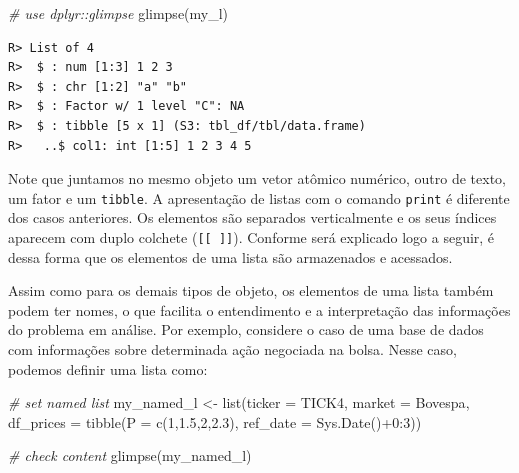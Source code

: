 \documentclass[
  11pt,
]{book}
\newenvironment{Shaded}{\begin{snugshade}}{\end{snugshade}}
\newcommand{\AttributeTok}[1]{\textcolor[rgb]{0.61,0.61,0.61}{#1}}
\newcommand{\CommentTok}[1]{\textcolor[rgb]{0.37,0.37,0.37}{\textit{#1}}}
\newcommand{\DecValTok}[1]{\textcolor[rgb]{0.06,0.06,0.06}{#1}}
\newcommand{\FloatTok}[1]{\textcolor[rgb]{0.06,0.06,0.06}{#1}}
\newcommand{\FunctionTok}[1]{\textcolor[rgb]{0,0,0}{#1}}
\newcommand{\NormalTok}[1]{#1}
\newcommand{\OtherTok}[1]{\textcolor[rgb]{0.37,0.37,0.37}{#1}}
\newcommand{\SpecialCharTok}[1]{\textcolor[rgb]{0,0,0}{#1}}
\newcommand{\StringTok}[1]{\textcolor[rgb]{0.5,0.5,0.5}{#1}}
\begin{document}
\begin{Shaded}
\begin{Highlighting}[]
\CommentTok{\# use dplyr::glimpse}
\FunctionTok{glimpse}\NormalTok{(my\_l)}
\end{Highlighting}
\end{Shaded}

\begin{verbatim}
R> List of 4
R>  $ : num [1:3] 1 2 3
R>  $ : chr [1:2] "a" "b"
R>  $ : Factor w/ 1 level "C": NA
R>  $ : tibble [5 x 1] (S3: tbl_df/tbl/data.frame)
R>   ..$ col1: int [1:5] 1 2 3 4 5
\end{verbatim}

Note que juntamos no mesmo objeto um vetor atômico numérico, outro de texto, um fator e um \texttt{tibble}. A apresentação de listas com o comando \texttt{print} é diferente dos casos anteriores. Os elementos são separados verticalmente e os seus índices aparecem com duplo colchete (\texttt{{[}{[}\ {]}{]}}). Conforme será explicado logo a seguir, é dessa forma que os elementos de uma lista são armazenados e acessados.

Assim como para os demais tipos de objeto, os elementos de uma lista também podem ter nomes, o que facilita o entendimento e a interpretação das informações do problema em análise. Por exemplo, considere o caso de uma base de dados com informações sobre determinada ação negociada na bolsa. Nesse caso, podemos definir uma lista como:

\begin{Shaded}
\begin{Highlighting}[]
\CommentTok{\# set named list}
\NormalTok{my\_named\_l }\OtherTok{\textless{}{-}} \FunctionTok{list}\NormalTok{(}\AttributeTok{ticker =} \StringTok{\textquotesingle{}TICK4\textquotesingle{}}\NormalTok{,}
                   \AttributeTok{market =} \StringTok{\textquotesingle{}Bovespa\textquotesingle{}}\NormalTok{,}
                   \AttributeTok{df\_prices =} \FunctionTok{tibble}\NormalTok{(}\AttributeTok{P =} \FunctionTok{c}\NormalTok{(}\DecValTok{1}\NormalTok{,}\FloatTok{1.5}\NormalTok{,}\DecValTok{2}\NormalTok{,}\FloatTok{2.3}\NormalTok{),}
                                      \AttributeTok{ref\_date =} \FunctionTok{Sys.Date}\NormalTok{()}\SpecialCharTok{+}\DecValTok{0}\SpecialCharTok{:}\DecValTok{3}\NormalTok{))}

\CommentTok{\# check content}
\FunctionTok{glimpse}\NormalTok{(my\_named\_l)}
\end{Highlighting}
\end{Shaded}
\end{document}
